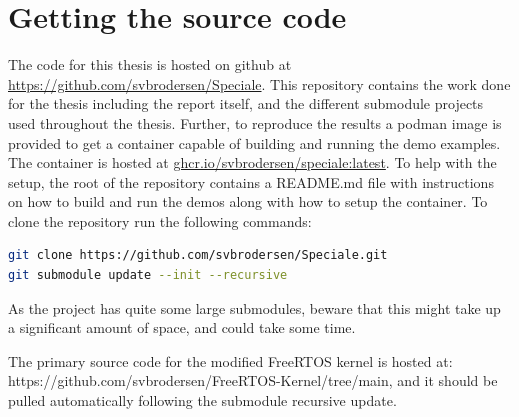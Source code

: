 \appendix

\section{Getting the source code}
The code for this thesis is hosted on github at
\url{https://github.com/svbrodersen/Speciale}. This repository contains the
work done for the thesis including the report itself, and the different
submodule projects used throughout the thesis. Further, to reproduce the
results a podman image is provided to get a container capable of building and
running the demo examples. The container is hosted at
\url{ghcr.io/svbrodersen/speciale:latest}. To help with the setup, the root of
the repository contains a README.md file with instructions on how to build and
run the demos along with how to setup the container. To clone the repository
run the following commands:

\begin{lstlisting}[language=bash]
git clone https://github.com/svbrodersen/Speciale.git
git submodule update --init --recursive
\end{lstlisting}
As the project has quite some large submodules, beware that this might take up
a significant amount of space, and could take some time.

The primary source code for the modified FreeRTOS kernel is hosted at:
https://github.com/svbrodersen/FreeRTOS-Kernel/tree/main, and it should be
pulled automatically following the submodule recursive update.
